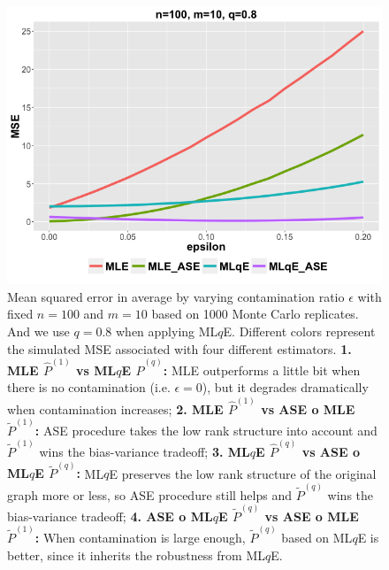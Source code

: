 \documentclass[a4paper]{article}
\renewcommand{\hat}{\widehat}
\begin{document}
\begin{figure}[!htb]
\centering
\includegraphics[width=1\textwidth]{eps.png}
\caption{Mean squared error in average by varying contamination ratio $\epsilon$ with fixed $n = 100$ and $m = 10$ based on 1000 Monte Carlo replicates. And we use $q=0.8$ when applying ML$q$E.
Different colors represent the simulated MSE associated with four different estimators.
\textbf{1. MLE $\hat{P}^{(1)}$ vs ML$q$E $\hat{P}^{(q)}$:}
MLE outperforms a little bit when there is no contamination (i.e. $\epsilon = 0$), but it degrades dramatically when contamination increases;
\textbf{2. MLE $\hat{P}^{(1)}$ vs ASE o MLE $\widetilde{P}^{(1)}$: }
ASE procedure takes the low rank structure into account and $\widetilde{P}^{(1)}$ wins the bias-variance tradeoff;
\textbf{3. ML$q$E $\hat{P}^{(q)}$ vs ASE o ML$q$E $\widetilde{P}^{(q)}$: }
ML$q$E preserves the low rank structure of the original graph more or less, so ASE procedure still helps and $\widetilde{P}^{(q)}$ wins the bias-variance tradeoff;
\textbf{4. ASE o ML$q$E $\widetilde{P}^{(q)}$ vs ASE o MLE $\widetilde{P}^{(1)}$: }
When contamination is large enough, $\widetilde{P}^{(q)}$ based on ML$q$E is better, since it inherits the robustness from ML$q$E.}
\label{fig:eps}
\end{figure}
\end{document}
